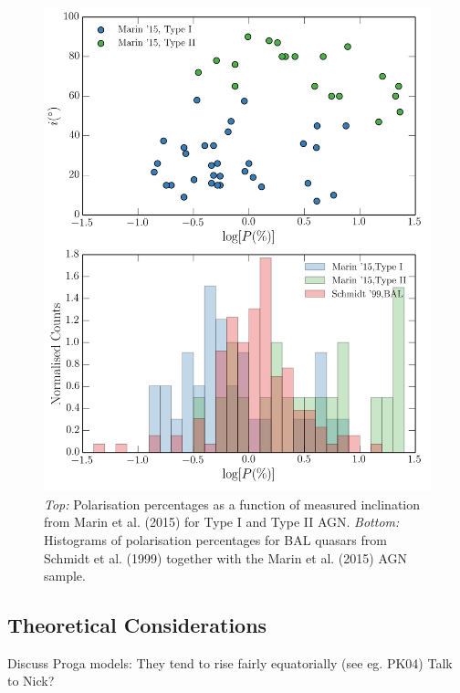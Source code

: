 \begin{figure}
\centering
\includegraphics[width=1.0\textwidth]{figures/ewpaper/hist_p.png}
\caption
{
{\sl Top:} 
Polarisation percentages as a function of measured inclination from
Marin et al. (2015) for Type I and Type II AGN.
{\sl Bottom:} Histograms of polarisation percentages 
for BAL quasars from Schmidt et al. (1999) together with the 
Marin et al. (2015) AGN sample. 
}
\label{fig:bal_polarisation}
\end{figure}


\subsection{Theoretical Considerations}

Discuss Proga models: They tend to rise fairly equatorially (see eg. PK04) Talk to Nick?


